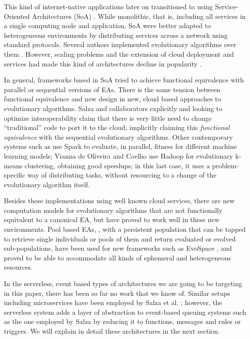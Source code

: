 \documentclass{llncs}
\begin{document}
  This kind of internet-native applications later on transitioned to
  using Service-Oriented Architectures (SoA) \cite{Papazoglou2007}. While monolithic, that is,
  including all services in a single computing node and application, SoA
  were better adapted to heterogeneous environments by distributing
  services across a network using standard protocols. Several authors
  implemented evolutionary algorithms over them
  \cite{garcia2013service,munawar2010design,6955331}. However, scaling
  problems and the extension of cloud deployment and services had made
  this kind of architectures decline in popularity
  \cite{Varghese2018849}.

  In general, frameworks based in SoA tried to achieve functional equivalence with parallel
  or sequential versions of EAs. There is the same tension between
  functional equivalence and new
  design in new, cloud based approaches to evolutionary
  algorithms. Salza and collaborators \cite{salza2017ccube,de2017parallel} explicitly
  and looking to optimize interoperability claim that there is very
  little need to change ``traditional'' code to port it to the cloud,
  implicitly claiming this {\em functional equivalence} with the
  sequential evolutionary algorithms. Other contemporary systems such as
  \cite{10.1007/978-3-319-32149-3_46} use Spark to evaluate, in
  parallel, fitness for different machine learning models;
  Vianna de Oliveira and Coelho \cite{de2015scalable} use Hadoop for evolutionary k-means clustering,
  obtaining good speedups; in this last case, it uses a problem-specific
  way of distributing tasks, without resourcing to a change of the
  evolutionary algorithm itself.

  Besides these implementations using well known cloud services, there are new computation models for evolutionary algorithms
  that are not functionally equivalent to a canonical EA, but have
  proved to work well in these new environments. Pool based EAs,
  \cite{bollini1999distributed}, with a persistent population that can
  be tapped to retrieve single individuals or pools of them and return
  evaluated or evolved sub-populations, have been used for new
  frameworks such as EvoSpace \cite{García-Valdez2015}, and proved to be
  able to accommodate all kinds of ephemeral and heterogeneous
  resources.

  In the serverless, event based types of architectures we are going to
  be targeting in this paper, there has been so far no work that we know
  of. Similar setups including microservices have been employed by Salza et
  al. \cite{salza2017ccube}; however, the serverless system adds a layer
  of abstraction to event-based queuing systems such as the one employed
  by Salza by reducing it to functions, messages and rules or
  triggers. We will explain in detail these architectures in the next
  section.
\end{document}

